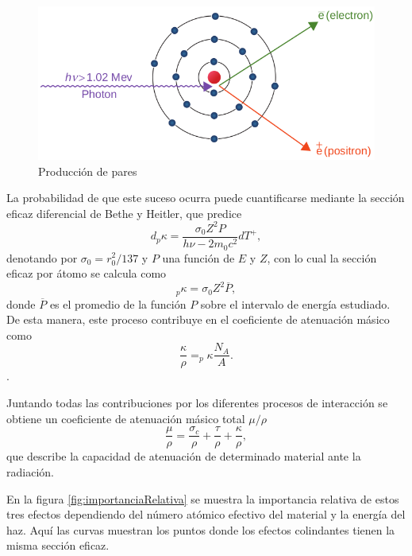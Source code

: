 \begin{figure}[H]
	\centering
	\includegraphics[width=0.7\linewidth]{images/produccionPares.png}
	\caption{Producción de pares \cite{khan2014the}}
	\label{fig:Pares}
\end{figure}

La probabilidad de que este suceso ocurra puede cuantificarse mediante la sección eficaz diferencial de Bethe y Heitler, que predice 
\begin{equation}
	d_{p}\kappa=\frac{\sigma_0 Z^2 P}{h\nu -2m_0c^2}dT^{+}, 
\end{equation}
denotando por $\sigma_0=r_{0}^2/137$ y $P$ una función de $E$ y $Z$, con lo cual la sección eficaz por átomo se calcula como
\begin{equation}
	_{p}\kappa=\sigma_0Z^2\overline{P},
\end{equation}
donde $\overline{P}$ es el promedio de la función $P$ sobre el intervalo de energía estudiado.\\

De esta manera, este proceso contribuye en el coeficiente de atenuación másico como
\begin{equation}
	\frac{\kappa}{\rho}=_{p}\kappa\frac{N_A}{A}.
\end{equation}.

Juntando todas las contribuciones por los diferentes procesos de interacción se obtiene un coeficiente de atenuación másico total $\mu/\rho$
\begin{equation}
	\frac{\mu}{\rho}=\frac{\sigma_c}{\rho}+\frac{\tau}{\rho}+\frac{\kappa}{\rho},
\end{equation}
que describe la capacidad de atenuación de determinado material ante la radiación.

En la figura \ref{fig:importanciaRelativa} se muestra la importancia relativa de estos tres efectos dependiendo del número atómico efectivo del material y la energía del haz. Aquí las curvas muestran los puntos donde los efectos colindantes tienen la misma sección eficaz.

